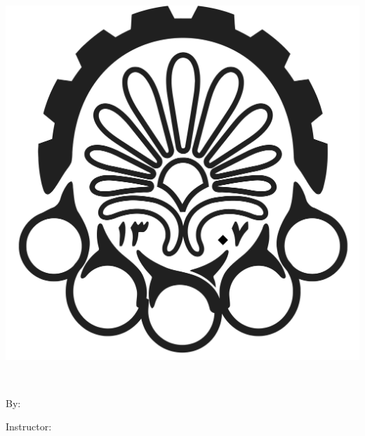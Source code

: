 
\pagestyle{empty}

\begin{center}

\begin{latin}

\includegraphics[scale=0.04]{front/template/images/logo.png}

\vspace{-0.2cm}
\EnglishThesisUniversity \\ [-0.3em]
\EnglishThesisDepartment

\begin{large}
\vspace{0.5cm}
\EnglishThesisDegree{}


\vspace{2cm}

{\Large\textbf\EnglishThesisTitle}

\vspace{1cm}

{\normalsize By:}\\
\textbf{\EnglishThesisAuthor}

\vspace{0.5cm}

{\normalsize Instructor:}\\ 
\textbf{\EnglishThesisSupervisor}

\end{large}

\vspace{0.2cm}
\EnglishThesisDate

\end{latin}

\end{center}
